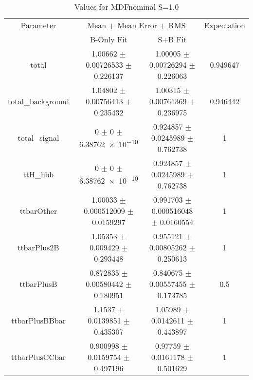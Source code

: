 \begin{table}
\centering
\caption{Values for MDFnominal S=1.0}
\begin{tabular}{cccc}
\toprule
Parameter & \multicolumn{2}{c}{Mean $\pm$ Mean Error $\pm$ RMS} & Expectation\\
 & B-Only Fit & S+B Fit & \\
\midrule
total & \num{1.00662} $\pm$ \num{0.00726533} $\pm$ \num{0.226137} & \num{1.00005} $\pm$ \num{0.00726294} $\pm$ \num{0.226063} & \num{0.949647}\\
total\_background & \num{1.04802} $\pm$ \num{0.00756413} $\pm$ \num{0.235432} & \num{1.00315} $\pm$ \num{0.00761369} $\pm$ \num{0.236975} & \num{0.946442}\\
total\_signal & \num{0} $\pm$ \num{0} $\pm$ \num{6.38762e-10} & \num{0.924857} $\pm$ \num{0.0245989} $\pm$ \num{0.762738} & \num{1}\\
ttH\_hbb & \num{0} $\pm$ \num{0} $\pm$ \num{6.38762e-10} & \num{0.924857} $\pm$ \num{0.0245989} $\pm$ \num{0.762738} & \num{1}\\
ttbarOther & \num{1.00033} $\pm$ \num{0.000512009} $\pm$ \num{0.0159297} & \num{0.991703} $\pm$ \num{0.000516048} $\pm$ \num{0.0160554} & \num{1}\\
ttbarPlus2B & \num{1.05353} $\pm$ \num{0.009429} $\pm$ \num{0.293448} & \num{0.955121} $\pm$ \num{0.00805262} $\pm$ \num{0.250613} & \num{1}\\
ttbarPlusB & \num{0.872835} $\pm$ \num{0.00580442} $\pm$ \num{0.180951} & \num{0.840675} $\pm$ \num{0.00557455} $\pm$ \num{0.173785} & \num{0.5}\\
ttbarPlusBBbar & \num{1.1537} $\pm$ \num{0.0139851} $\pm$ \num{0.435307} & \num{1.05989} $\pm$ \num{0.0142611} $\pm$ \num{0.443897} & \num{1}\\
ttbarPlusCCbar & \num{0.900998} $\pm$ \num{0.0159754} $\pm$ \num{0.497196} & \num{0.97759} $\pm$ \num{0.0161178} $\pm$ \num{0.501629} & \num{1}\\
\bottomrule
\end{tabular}
\end{table}